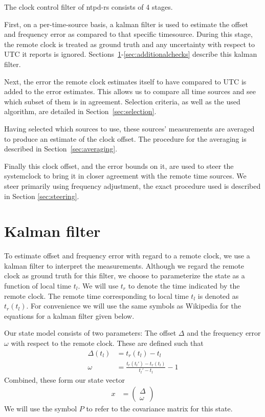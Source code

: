 \documentclass{article}
\begin{document}
The clock control filter of ntpd-rs consists of 4 stages.

First, on a per-time-source basis, a kalman filter is used to estimate the offset and frequency error as compared to that specific timesource.
During this stage, the remote clock is treated as ground truth and any uncertainty with respect to UTC it reports is ignored.
Sections~\ref{sec:kalmanfilter}-\ref{sec:additionalchecks} describe this kalman filter.

Next, the error the remote clock estimates itself to have compared to UTC is added to the error estimates.
This allows us to compare all time sources and see which subset of them is in agreement.
Selection criteria, as well as the used algorithm, are detailed in Section~\ref{sec:selection}.

Having selected which sources to use, these sources' measurements are averaged to produce an estimate of the clock offset.
The procedure for the averaging is described in Section~\ref{sec:averaging}.

Finally this clock offset, and the error bounds on it, are used to steer the systemclock to bring it in closer agreement with the remote time sources.
We steer primarily using frequency adjustment, the exact procedure used is described in Section \ref{sec:steering}.

\section{Kalman filter}\label{sec:kalmanfilter}

To estimate offset and frequency error with regard to a remote clock, we use a kalman filter to interpret the measurements.
Although we regard the remote clock as ground truth for this filter, we choose to parameterize the state as a function of local time $t_l$.
We will use $t_r$ to denote the time indicated by the remote clock.
The remote time corresponding to local time $t_l$ is denoted as $t_r(t_l)$.
For convenience we will use the same symbols as Wikipedia for the equations for a kalman filter given below.

Our state model consists of two parameters: The offset $\Delta$ and the frequency error $\omega$ with respect to the remote clock. These are defined such that
\begin{align}
\Delta(t_l) &= t_r(t_l) - t_l \\
\omega &= \frac{t_r(t_l') - t_r(t_l)}{t_l' - t_l} - 1
\end{align}
Combined, these form our state vector
\begin{align}
x &= \begin{pmatrix}
\Delta\\
\omega
\end{pmatrix}
\end{align}
We will use the symbol $P$ to refer to the covariance matrix for this state.
\end{document}
